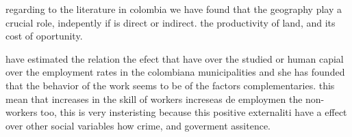 \documentclass[12pt,letterpaper]{report}
\begin{document}
regarding to the literature in colombia we have found that the geography play  a crucial role, indepently if is direct or indirect. the productivity of land, and its cost of oportunity.




\cite{diaz} have estimated  the relation the efect that have over the studied or human capial over the employment rates in the colombiana municipalities and she has founded that the behavior of the work seems to be of the factors complementaries. this mean that increases in the skill of workers increseas de employmen the non-workers too, this is very insteristing because this positive externaliti  have a effect over other social variables how crime, and goverment assitence.










\end{document}
